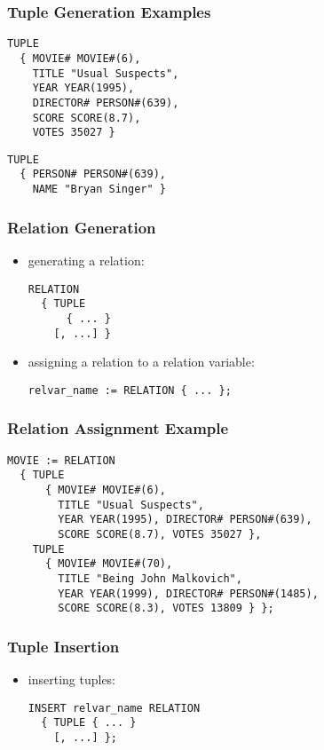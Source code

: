 \documentclass[dvipsnames]{beamer}
\theoremstyle{plain}
\begin{document}
\begin{frame}[fragile]
  \frametitle{Tuple Generation Examples}

  \begin{lstlisting}
TUPLE
  { MOVIE# MOVIE#(6),
    TITLE "Usual Suspects",
    YEAR YEAR(1995),
    DIRECTOR# PERSON#(639),
    SCORE SCORE(8.7),
    VOTES 35027 }
  \end{lstlisting}

  \begin{lstlisting}
TUPLE
  { PERSON# PERSON#(639),
    NAME "Bryan Singer" }
  \end{lstlisting}
\end{frame}

\begin{frame}[fragile]
  \frametitle{Relation Generation}

  \begin{itemize}
    \item generating a relation:
    \begin{lstlisting}
RELATION
  { TUPLE
      { ... }
    [, ...] }
    \end{lstlisting}

    \item assigning a relation to a relation variable:
    \begin{lstlisting}
relvar_name := RELATION { ... };
    \end{lstlisting}
  \end{itemize}
\end{frame}

\begin{frame}[fragile]
  \frametitle{Relation Assignment Example}

  \begin{lstlisting}
MOVIE := RELATION
  { TUPLE
      { MOVIE# MOVIE#(6),
        TITLE "Usual Suspects",
        YEAR YEAR(1995), DIRECTOR# PERSON#(639),
        SCORE SCORE(8.7), VOTES 35027 },
    TUPLE
      { MOVIE# MOVIE#(70),
        TITLE "Being John Malkovich",
        YEAR YEAR(1999), DIRECTOR# PERSON#(1485),
        SCORE SCORE(8.3), VOTES 13809 } };
  \end{lstlisting}
\end{frame}

\begin{frame}[fragile]
  \frametitle{Tuple Insertion}

  \begin{itemize}
    \item inserting tuples:
    \begin{lstlisting}
INSERT relvar_name RELATION
  { TUPLE { ... }
    [, ...] };
    \end{lstlisting}
  \end{itemize}
\end{frame}
\end{document}

